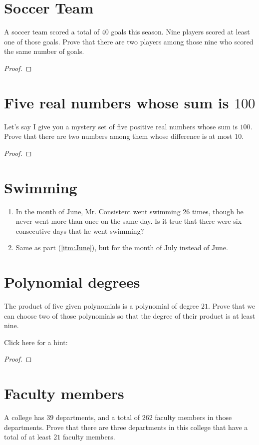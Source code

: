\documentclass[12pt]{amsart}
\begin{document}
\section{Soccer Team} 
A soccer team scored a total of 40 goals this season. Nine players scored at least one of those goals. Prove that there are two players among those nine who scored the same number of goals.
\begin{proof}
\end{proof}


\section{Five real numbers whose sum is $100$} 
Let's say I give you a mystery set of five positive real numbers whose sum is $100$. Prove that there are two numbers among them whose difference is at most $10$.

\begin{proof}
\end{proof}

\section{Swimming}\label{sec:swimming}
\begin{enumerate}
    \item \label{itm:June}
    In the month of June, Mr. Consistent went swimming $26$ times, though he never went more than once on the same day. Is it true that there were six consecutive days that he went swimming?
    
    \item Same as part (\ref{itm:June}), but for the month of July instead of June. 
\end{enumerate}

\section{Polynomial degrees}\label{sec:polynomial_degrees}
The product of five given polynomials is a polynomial of degree $21$. Prove that we can choose two of those polynomials so that the degree of their product is at least nine.

Click here for a hint: %
\begin{proof}
\end{proof}

\section{Faculty members}
A college has $39$ departments, and a total of $262$ faculty members in those departments. Prove that there are three departments in this college that have a total of at least $21$ faculty members.
\end{document}

